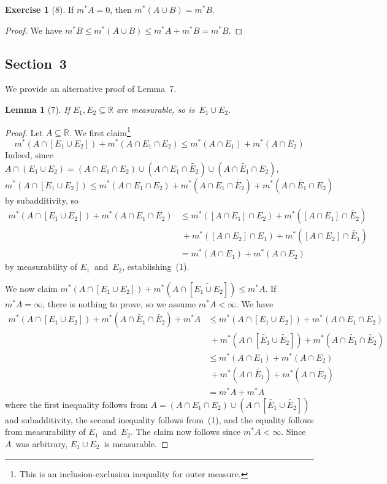 \documentclass[letterpaper,12pt]{article}
\newcommand{\R}{\mathbb{R}}
\newcommand{\union}{\cup}
\newcommand{\sect}{\cap}
\newcommand{\mo}{m^*}
\newcommand{\comp}[1]{\widetilde{#1}}
\theoremstyle{plain}
\newtheorem*{lem}{Lemma}
\theoremstyle{definition}
\newtheorem*{exer}{Exercise}
\theoremstyle{remark}
\begin{document}
\begin{exer}[8]
If \(\mo A=0\), then \(\mo(A\union B)=\mo B\).
\end{exer}
\begin{proof}
We have \(\mo B\le\mo(A\union B)\le\mo A+\mo B=\mo B\).
\end{proof}

\subsection*{Section~3}
We provide an alternative proof of Lemma~7.
\begin{lem}[7]
If \(E_1,E_2\subseteq\R\) are measurable, so is~\(E_1\union E_2\).
\end{lem}
\begin{proof}
Let \(A\subseteq\R\). We first claim\footnote{This is an inclusion-exclusion inequality for outer measure.}
\[\mo(A\sect[E_1\union E_2])+\mo(A\sect E_1\sect E_2)\le\mo(A\sect E_1)+\mo(A\sect E_2)\tag{1}\]
Indeed, since \(A\sect(E_1\union E_2)=(A\sect E_1\sect E_2)\union(A\sect E_1\sect\comp{E_2})\union(A\sect\comp{E_1}\sect E_2)\),
\[\mo(A\sect[E_1\union E_2])\le\mo(A\sect E_1\sect E_2)+\mo(A\sect E_1\sect\comp{E_2})+\mo(A\sect\comp{E_1}\sect E_2)\]
by subadditivity, so
\begin{align*}
\mo(A\sect[E_1\union E_2])+\mo(A\sect E_1\sect E_2)&\le\mo([A\sect E_1]\sect E_2)+\mo([A\sect E_1]\sect\comp{E_2})\\
	&\ +\mo([A\sect E_2]\sect E_1)+\mo([A\sect E_2]\sect\comp{E_1})\\
	&=\mo(A\sect E_1)+\mo(A\sect E_2)
\end{align*}
by measurability of \(E_1\)~and~\(E_2\), establishing~(1).

We now claim \(\mo(A\sect[E_1\union E_2])+\mo(A\sect[\comp{E_1\union E_2}])\le\mo A\). If \(\mo A=\infty\), there is nothing to prove, so we assume \(\mo A<\infty\). We have
\begin{align*}
\mo(A\sect[E_1\union E_2])+\mo(A\sect\comp{E_1}\sect\comp{E_2})+\mo A&\le\mo(A\sect[E_1\union E_2])+\mo(A\sect E_1\sect E_2)\\
	&\ +\mo(A\sect[\comp{E_1}\union\comp{E_2}])+\mo(A\sect\comp{E_1}\sect\comp{E_2})\\
	&\le\mo(A\sect E_1)+\mo(A\sect E_2)\\
	&\ +\mo(A\sect\comp{E_1})+\mo(A\sect\comp{E_2})\\
	&=\mo A+\mo A
\end{align*}
where the first inequality follows from \(A=(A\sect E_1\sect E_2)\union(A\sect[\comp{E_1}\union\comp{E_2}])\) and subadditivity, the second inequality follows from~(1), and the equality follows from measurability of \(E_1\)~and~\(E_2\). The claim now follows since \(\mo A<\infty\). Since \(A\)~was arbitrary, \(E_1\union E_2\)~is measurable.
\end{proof}
\end{document}
